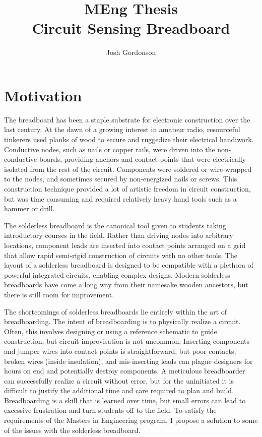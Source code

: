 \documentclass[11pt, a4paper]{article}
\title{MEng Thesis \\ Circuit Sensing Breadboard}
\author{Josh Gordonson}
\begin{document}
\maketitle

\section{Motivation}
The breadboard has been a staple substrate for electronic construction over the last century.
At the dawn of a growing interest in amateur radio, resourceful tinkerers used planks of wood to secure and ruggedize their electrical handiwork.
Conductive nodes, such as nails or copper rails, were driven into the non-conductive boards, providing anchors and contact points that were electrically isolated from the rest of the circuit.
Components were soldered or wire-wrapped to the nodes, and sometimes secured by non-energized nails or screws.
This construction technique provided a lot of artistic freedom in circuit construction, but was time consuming and required relatively heavy hand tools such as a hammer or drill.

The solderless breadboard is the canonical tool given to students taking introductory courses in the field.
Rather than driving nodes into arbitrary locations, component leads are inserted into contact points arranged on a grid that allow rapid semi-rigid construction of circuits with no other tools.
The layout of a solderless breadboard is designed to be compatible with a plethora of powerful integrated circuits, enabling complex designs.
Modern solderless breadboards have come a long way from their namesake wooden ancestors, but there is still room for improvement.

The shortcomings of solderless breadboards lie entirely within the art of breadboarding.
The intent of breadboarding is to physically realize a circuit.
Often, this involves designing or using a reference schematic to guide construction, but circuit improvisation is not uncommon.
Inserting components and jumper wires into contact points is straightforward, but poor contacts, broken wires (inside insulation), and mis-inserting leads can plague designers for hours on end and potentially destroy components.
A meticulous breadboarder can successfully realize a circuit without error, but for the uninitiated it is difficult to justify the additional time and care required to plan and build.
Breadboarding is a skill that is learned over time, but small errors can lead to excessive frustration and turn students off to the field.
To satisfy the requirements of the Masters in Engineering program, I propose a solution to some of the issues with the solderless breadboard.
\end{document}
